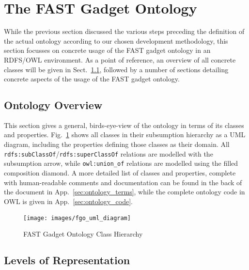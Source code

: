 \documentclass{article}
\begin{document}
%
%
%
\clearpage
\section{The FAST Gadget Ontology} %
\label{sec:ontology}

While the previous section discussed the various steps preceding the definition of the actual ontology according to our chosen development methodology, this section focusses on concrete usage of the FAST gadget ontology in an RDFS/OWL environment. As a point of reference, an overview of all concrete classes will be given in Sect.~\ref{sub:ontology_overview}, followed by a number of sections detailing concrete aspects of the usage of the FAST gadget ontology.

\subsection{Ontology Overview} %
\label{sub:ontology_overview}

This section gives a general, birds-eye-view of the ontology in terms of its classes and properties. Fig.~\ref{fig:ontology_uml} shows all classes in their subsumption hierarchy as a UML diagram, including the properties defining those classes as their domain. All \texttt{rdfs:subClassOf}/\texttt{rdfs:superClassOf} relations are modelled with the subsumption arrow, while \texttt{owl:union\_of} relations are modelled using the filled composition diamond.
A more detailed list of classes and properties, complete with human-readable comments and documentation can be found in the back of the document in App.~\ref{sec:ontology_terms}, while the complete ontology code in OWL is given in App.~\ref{sec:ontology_code}.

\begin{figure}
  \begin{center}
    \texttt{[image: images/fgo\_uml\_diagram]}
    \caption{FAST Gadget Ontology Class Hierarchy}
    \label{fig:ontology_uml}
  \end{center}
\end{figure}



\subsection{Levels of Representation} %
\label{sub:classes_instances_and_templates}
\end{document}
